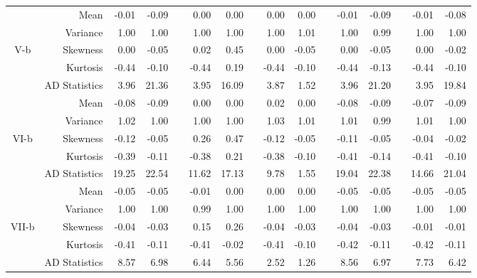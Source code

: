 \documentclass[11pt,authoryear,review,3p,times]{elsarticle}
\begin{document}
\begin{table}[htbp]
{\begin{tabular}{crrrrrrrrrrrrrrr}
				\hline
				& Mean  & -0.01 & -0.09 &       & 0.00  & 0.00  &       & 0.00  & 0.00  &       & -0.01 & -0.09 &       & -0.01 & -0.08 \\
				& Variance    & 1.00  & 1.00  &       & 1.00  & 1.00  &       & 1.00  & 1.01  &       & 1.00  & 0.99  &       & 1.00  & 1.00 \\
				V-b    & Skewness & 0.00  & -0.05 &       & 0.02  & 0.45  &       & 0.00  & -0.05 &       & 0.00  & -0.05 &       & 0.00  & -0.02 \\
				& Kurtosis & -0.44 & -0.10 &       & -0.44 & 0.19  &       & -0.44 & -0.10 &       & -0.44 & -0.13 &       & -0.44 & -0.10 \\
				& AD Statistics & 3.96  & 21.36 &       & 3.95  & 16.09 &       & 3.87  & 1.52  &       & 3.96  & 21.20 &       & 3.95  & 19.84 \\
				\hline
				& Mean  & -0.08 & -0.09 &       & 0.00  & 0.00  &       & 0.02  & 0.00  &       & -0.08 & -0.09 &       & -0.07 & -0.09 \\
				& Variance    & 1.02  & 1.00  &       & 1.00  & 1.00  &       & 1.03  & 1.01  &       & 1.01  & 0.99  &       & 1.01  & 1.00 \\
				VI-b    & Skewness & -0.12 & -0.05 &       & 0.26  & 0.47  &       & -0.12 & -0.05 &       & -0.11 & -0.05 &       & -0.04 & -0.02 \\
				& Kurtosis & -0.39 & -0.11 &       & -0.38 & 0.21  &       & -0.38 & -0.10 &       & -0.41 & -0.14 &       & -0.41 & -0.10 \\
				& AD Statistics & 19.25 & 22.54 &       & 11.62 & 17.13 &       & 9.78  & 1.55  &       & 19.04 & 22.38 &       & 14.66 & 21.04 \\
				\hline
				& Mean  & -0.05 & -0.05 &       & -0.01 & 0.00  &       & 0.00  & 0.00  &       & -0.05 & -0.05 &       & -0.05 & -0.05 \\
				& Variance    & 1.00  & 1.00  &       & 0.99  & 1.00  &       & 1.00  & 1.00  &       & 1.00  & 1.00  &       & 1.00  & 1.00 \\
				VII-b     & Skewness & -0.04 & -0.03 &       & 0.15  & 0.26  &       & -0.04 & -0.03 &       & -0.04 & -0.03 &       & -0.01 & -0.01 \\
				& Kurtosis & -0.41 & -0.11 &       & -0.41 & -0.02 &       & -0.41 & -0.10 &       & -0.42 & -0.11 &       & -0.42 & -0.11 \\
				& AD Statistics & 8.57  & 6.98  &       & 6.44  & 5.56  &       & 2.52  & 1.26  &       & 8.56  & 6.97  &       & 7.73  & 6.42 \\
				\hline
			\end{tabular}%
		}
		\label{tab:ig}%
	\end{table}%
\end{document}
